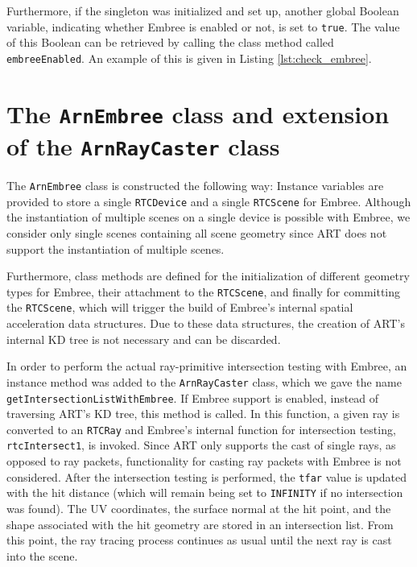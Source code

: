 Furthermore, if the singleton was initialized and set up, another global Boolean variable, indicating whether Embree is enabled or not, is set to \texttt{true}. The value of this Boolean can be retrieved by calling the class method called \texttt{embreeEnabled}. An example of this is given in Listing \ref{lst:check_embree}.

\section{The \texttt{ArnEmbree} class and extension of the \texttt{ArnRayCaster} class}

The \texttt{ArnEmbree} class is constructed the following way: Instance variables are provided to store a single \texttt{RTCDevice} and a single \texttt{RTCScene} for Embree. Although the instantiation of multiple scenes on a single device is possible with Embree, we consider only single scenes containing all scene geometry since ART does not support the instantiation of multiple scenes.

Furthermore, class methods are defined for the initialization of different geometry types for Embree, their attachment to the \texttt{RTCScene}, and finally for committing the \texttt{RTCScene}, which will trigger the build of Embree's internal spatial acceleration data structures. Due to these data structures, the creation of ART's internal KD tree is not necessary and can be discarded.

In order to perform the actual ray-primitive intersection testing with Embree, an instance method was added to the \texttt{ArnRayCaster} class, which we gave the name \texttt{getIntersectionListWithEmbree}. If Embree support is enabled, instead of traversing ART's KD tree, this method is called. In this function, a given ray is converted to an \texttt{RTCRay} and Embree's internal function for intersection testing, \texttt{rtcIntersect1}, is invoked. Since ART only supports the cast of single rays, as opposed to ray packets, functionality for casting ray packets with Embree is not considered. After the intersection testing is performed, the \texttt{tfar} value is updated with the hit distance (which will remain being set to \texttt{INFINITY} if no intersection was found). The UV coordinates, the surface normal at the hit point, and the shape associated with the hit geometry are stored in an intersection list. From this point, the ray tracing process continues as usual until the next ray is cast into the scene.

